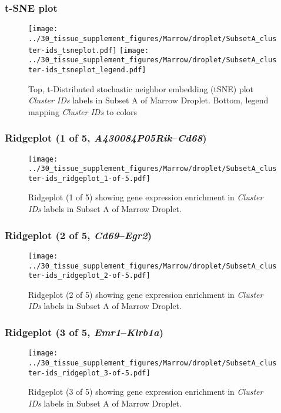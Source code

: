 \clearpage
\subsubsection{t-SNE plot}
\begin{figure}[h]
\centering
\texttt{[image: ../30\_tissue\_supplement\_figures/Marrow/droplet/SubsetA\_cluster-ids\_tsneplot.pdf]}
\texttt{[image: ../30\_tissue\_supplement\_figures/Marrow/droplet/SubsetA\_cluster-ids\_tsneplot\_legend.pdf]}
\caption{Top, t-Distributed stochastic neighbor embedding (tSNE) plot  \emph{Cluster IDs} labels in Subset A of Marrow Droplet. Bottom, legend mapping \emph{Cluster IDs} to colors}
\end{figure}


\clearpage

\subsubsection{Ridgeplot (1 of 5, \emph{A430084P05Rik}--\emph{Cd68})}
\begin{figure}[h]
\centering
\texttt{[image: ../30\_tissue\_supplement\_figures/Marrow/droplet/SubsetA\_cluster-ids\_ridgeplot\_1-of-5.pdf]}

\caption{ Ridgeplot (1 of 5)  showing gene expression enrichment in \emph{Cluster IDs} labels in Subset A of Marrow Droplet. }
\end{figure}


\clearpage

\subsubsection{Ridgeplot (2 of 5, \emph{Cd69}--\emph{Egr2})}
\begin{figure}[h]
\centering
\texttt{[image: ../30\_tissue\_supplement\_figures/Marrow/droplet/SubsetA\_cluster-ids\_ridgeplot\_2-of-5.pdf]}

\caption{ Ridgeplot (2 of 5)  showing gene expression enrichment in \emph{Cluster IDs} labels in Subset A of Marrow Droplet. }
\end{figure}


\clearpage

\subsubsection{Ridgeplot (3 of 5, \emph{Emr1}--\emph{Klrb1a})}
\begin{figure}[h]
\centering
\texttt{[image: ../30\_tissue\_supplement\_figures/Marrow/droplet/SubsetA\_cluster-ids\_ridgeplot\_3-of-5.pdf]}

\caption{ Ridgeplot (3 of 5)  showing gene expression enrichment in \emph{Cluster IDs} labels in Subset A of Marrow Droplet. }
\end{figure}


